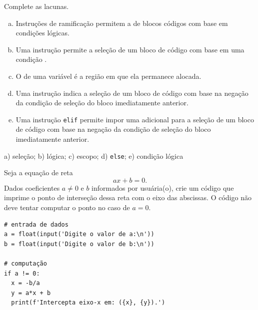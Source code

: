 \begin{exer}
  Complete as lacunas.
  \begin{enumerate}[a)]
    \item Instruções de ramificação permitem a \underline{\phantom{seleção}} de blocos códigos com base em condições lógicas.
    \item Uma instrução \underline{\phantom{{\PYTHONif}}} permite a seleção de um bloco de código com base em uma condição \underline{\phantom{lógica}}.
    \item O \underline{\phantom{escopo}} de uma variável é a região em que ela permanece alocada.
    \item Uma instrução \underline{} indica a seleção de um bloco de código com base na negação da condição de seleção do bloco imediatamente anterior.
    \item Uma instrução \texttt{elif} permite impor uma \underline{\phantom{condição lógica}} adicional para a seleção de um bloco de código com base na negação da condição de seleção do bloco imediatamente anterior.
  \end{enumerate}
\end{exer}
\begin{resp}
  a) seleção; b) lógica; c) escopo; d) \texttt{else}; e) condição lógica
\end{resp}


\begin{exer}
  Seja a equação de reta
  \begin{equation}
    ax + b = 0.
  \end{equation}
  Dados coeficientes $a \neq 0$ e $b$ informados por usuária(o), crie um código que imprime o ponto de interseção dessa reta com o eixo das abscissas. O código não deve tentar computar o ponto no caso de $a=0$. 
\end{exer}
\begin{resp}

\begin{lstlisting}
# entrada de dados
a = float(input('Digite o valor de a:\n'))
b = float(input('Digite o valor de b:\n'))

# computação
if a != 0:
  x = -b/a
  y = a*x + b
  print(f'Intercepta eixo-x em: ({x}, {y}).')
\end{lstlisting}

\end{resp}

